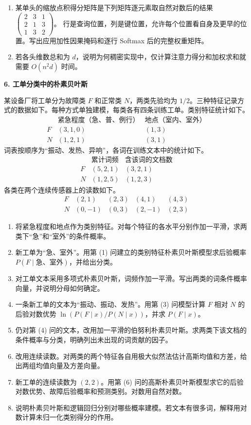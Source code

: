 \begin{enumerate}[label=(\arabic*)]
\item 某单头的缩放点积得分矩阵是下列矩阵逐元素取自然对数后的结果
$\begin{pmatrix}2&3&1\\2&1&3\\1&3&2\end{pmatrix}$。
行是查询位置，列是键位置，允许每个位置看自身及更早的位置。写出应用加性因果掩码和逐行 Softmax 后的完整权重矩阵。
\item 若各头维数总和为 $d$，说明为何稠密实现中，仅计算注意力得分和加权求和就需要 $O(n^2d)$ 时间。
\end{enumerate}

\noindent\textbf{6. 工单分类中的朴素贝叶斯}

某设备厂将工单分为故障类 $F$ 和正常类 $N$，两类先验均为 $1/2$。三种特征记录方式的数据如下。每种方式单独建模，每类各有四条训练工单。类别特征统计如下。
\[
\begin{array}{c|cc}
 &\text{紧急程度（急、普、例行）}&\text{地点（室内、室外）}\\\hline
F&(3,1,0)&(1,3)\\
N&(1,2,1)&(3,1)
\end{array}
\]
词表按顺序为“振动、发热、异响”，各词在训练文本中的统计如下。
\[
\begin{array}{c|cc}
 &\text{累计词频}&\text{含该词的文档数}\\\hline
F&(5,2,1)&(3,2,1)\\
N&(1,2,5)&(1,2,3)
\end{array}
\]
各类在两个连续传感器上的读数如下。
\[
\begin{array}{c|rrrr}
F&(2,1)&(2,3)&(4,1)&(4,3)\\
N&(0,-1)&(0,3)&(2,-1)&(2,3)
\end{array}
\]
\begin{enumerate}[label=(\arabic*)]
\item 将紧急程度和地点作为类别特征。对每个特征的各水平分别作加一平滑，求两类下“急”和“室外”的条件概率。
\item 新工单为“急、室外”。用第 (1) 问建立的类别特征朴素贝叶斯模型求后验概率 $P(F\mid\text{急、室外})$，并给出分类。
\item 对工单文本采用多项式朴素贝叶斯，词频作加一平滑。写出两类的词条件概率向量，并说明分母如何确定。
\item 一条新工单的文本为“振动、振动、发热”。用第 (3) 问模型计算 $F$ 相对 $N$ 的后验对数优势 $\ln(P(F\mid x)/P(N\mid x))$，并求 $P(F\mid x)$。
\item 仍对第 (4) 问的文本，改用加一平滑的伯努利朴素贝叶斯。求两类下该文档的条件概率与分类，明确列出未出现的词贡献的因子。
\item 改用连续读数。对两类的两个特征各自用极大似然法估计高斯均值和方差，给出两组均值向量及方差向量。
\item 新工单的连续读数为 $(2,2)$。用第 (6) 问的高斯朴素贝叶斯模型求它的后验对数优势、故障后验概率和预测类别。对数用自然对数。
\item 说明朴素贝叶斯和逻辑回归分别对哪些概率建模。若文本有很多词，解释用对数计算未归一化类别得分的作用。
\end{enumerate}


